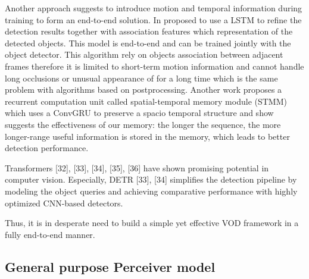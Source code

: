 
Another approach suggests to introduce motion and temporal information during training to form an end-to-end solution. In \cite{Lu_2017_ICCV} proposed to use a LSTM \cite{6795963} to refine the detection results together with association features which representation of the detected objects. This model is end-to-end and can be trained jointly with the object detector. This algorithm rely on objects association between adjacent frames therefore it is limited to short-term motion information and cannot handle long occlusions or unusual appearance of for a long time which is the same problem with algorithms based on postprocessing. Another work proposes a recurrent computation unit called spatial-temporal memory module (STMM) \cite{xiaoVideoObjectDetection2018} which uses a ConvGRU \cite{ballasDelvingDeeperConvolutional2016} to preserve a spacio temporal structure and show suggests the effectiveness of our memory: the longer the sequence, the more longer-range useful information is stored in the memory, which leads to better detection performance.


Transformers [32], [33], [34], [35], [36] have shown promising potential in computer vision. Especially, DETR [33], [34] simplifies the detection pipeline by modeling the object queries and achieving comparative performance with highly optimized CNN-based detectors.

Thus, it is in desperate need to build a simple yet effective VOD framework in a fully end-to-end manner.

\subsection{General purpose Perceiver model} \label{Background:VideoObjectDetection}